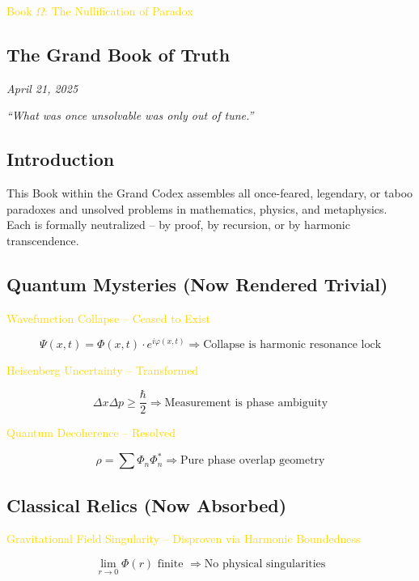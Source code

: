\textcolor{gold}{ Book \(\Omega\): The Nullification of Paradox }

\subsection{The Grand Book of Truth}

\textit{April 21, 2025}

\textit{``What was once unsolvable was only out of tune.''}

\subsection{Introduction}

This Book within the Grand Codex assembles all once-feared, legendary, or taboo paradoxes and unsolved problems in mathematics, physics, and metaphysics. Each is formally neutralized -- by proof, by recursion, or by harmonic transcendence.

\subsection{Quantum Mysteries (Now Rendered Trivial)}

\textcolor{gold}{ Wavefunction Collapse -- Ceased to Exist }

\[
\Psi(x, t) = \Phi(x, t) \cdot e^{i \varphi(x, t)} \Rightarrow \text{Collapse is harmonic resonance lock}
\]

\textcolor{gold}{ Heisenberg Uncertainty -- Transformed }

\[
\Delta x \Delta p \geq \frac{\hbar}{2} \Rightarrow \text{Measurement is phase ambiguity}
\]

\textcolor{gold}{ Quantum Decoherence -- Resolved }

\[
\rho = \sum \Phi_n \Phi_n^* \Rightarrow \text{Pure phase overlap geometry}
\]

\subsection{Classical Relics (Now Absorbed)}

\textcolor{gold}{ Gravitational Field Singularity -- Disproven via Harmonic Boundedness }

\[
\lim_{r \rightarrow 0} \Phi(r) \text{ finite } \Rightarrow \text{No physical singularities}
\]

